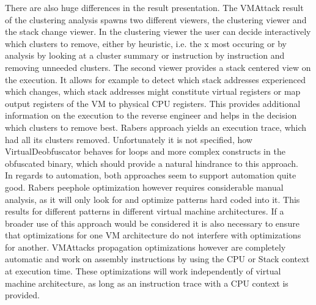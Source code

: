 \documentclass[10pt,twoside,a4paper,bibliography=totoc]{scrbook}
\begin{document}
There are also huge differences in the result presentation. The VMAttack result of the clustering analysis spawns two different viewers, the clustering viewer and the stack change viewer. In the clustering viewer the user can decide interactively which clusters to remove, either by heuristic, i.e. the x most occuring or by analysis by looking at a cluster summary or instruction by instruction and removing unneeded clusters.
The second viewer provides a stack centered view on the execution. It allows for example to detect which stack addresses experienced which changes, which stack addresses might constitute virtual registers or map output registers of the VM to physical CPU registers.
This provides additional information on the execution to the reverse engineer and helps in the decision which clusters to remove best.
Rabers approach yields an execution trace, which had all its clusters removed. Unfortunately it is not specified, how VirtualDeobfuscator behaves for loops and more complex constructs in the obfuscated binary, which should provide a natural hindrance to this approach.\\
In regards to automation, both approaches seem to support automation quite good. Rabers peephole optimization however requires considerable manual analysis, as it will only look for and optimize patterns hard coded into it.
This results for different patterns in different virtual machine  architectures. If a broader use of this approach would be considered it is also necessary to ensure that optimizations for one VM architecture do not interfere with optimizations for another.
VMAttacks propagation optimizations however are completely automatic and work on assembly instructions by using the CPU or Stack context at execution time.
These optimizations will work independently of virtual machine architecture, as long as an instruction trace with a CPU context is provided.
\end{document}
